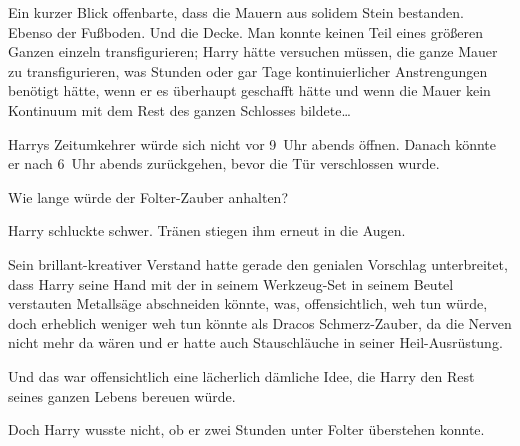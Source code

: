 Ein kurzer Blick offenbarte, dass die Mauern aus solidem Stein bestanden. Ebenso der Fußboden. Und die Decke. Man konnte keinen Teil eines größeren Ganzen einzeln transfigurieren; Harry hätte versuchen müssen, die ganze Mauer zu transfigurieren, was Stunden oder gar Tage kontinuierlicher Anstrengungen benötigt hätte, wenn er es überhaupt geschafft hätte und wenn die Mauer kein Kontinuum mit dem Rest des ganzen Schlosses bildete…

Harrys Zeitumkehrer würde sich nicht vor 9~Uhr abends öffnen. Danach könnte er nach 6~Uhr abends zurückgehen, bevor die Tür verschlossen wurde.

Wie lange würde der Folter-Zauber anhalten?

Harry schluckte schwer. Tränen stiegen ihm erneut in die Augen.

Sein brillant-kreativer Verstand hatte gerade den genialen Vorschlag unterbreitet, dass Harry seine Hand mit der in seinem Werkzeug-Set in seinem Beutel verstauten Metallsäge abschneiden könnte, was, offensichtlich, weh tun würde, doch erheblich weniger weh tun könnte als Dracos Schmerz-Zauber, da die Nerven nicht mehr da wären und er hatte auch Stauschläuche in seiner Heil-Ausrüstung.

Und das war offensichtlich eine lächerlich dämliche Idee, die Harry den Rest seines ganzen Lebens bereuen würde.

Doch Harry wusste nicht, ob er zwei Stunden unter Folter überstehen konnte.

